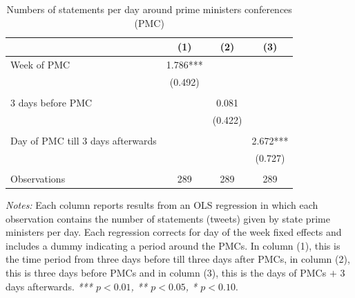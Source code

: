 \begin{table}[htbp]
\caption{Numbers of statements per day around prime ministers conferences (PMC)}
\begin{tabular}{lccc}	\toprule
    & (1) & (2) & (3) \\	\midrule
Week of PMC & 1.786*** &  &  \\
    & (0.492) &  &  \\
    & & &			\\
3 days before PMC &  & 0.081 &  \\
    &  & (0.422) &  \\
    & & &			\\
Day of PMC till 3 days afterwards &  &  & 2.672*** \\
    &  &  & (0.727) \\
    & & &			\\ \midrule 
Observations & 289 & 289 & 289 \\ \bottomrule
\end{tabular}
\label{tb.pmc}
\begin{minipage}{\textwidth}
\small
\textit{Notes:} Each column reports results from an OLS regression in which each observation contains the number of statements (tweets) given by state prime ministers per day. Each regression corrects for day of the week fixed effects and includes a dummy indicating a period around the PMCs. In column (1), this is the time period from three days before till three days after PMCs, in column (2), this is three days before PMCs and in column (3), this is the days of PMCs $+$ 3 days afterwards. \newline \textit{*** $p < 0.01$, ** $p < 0.05$, * $p < 0.10$}.
	\end{minipage}
\end{table}